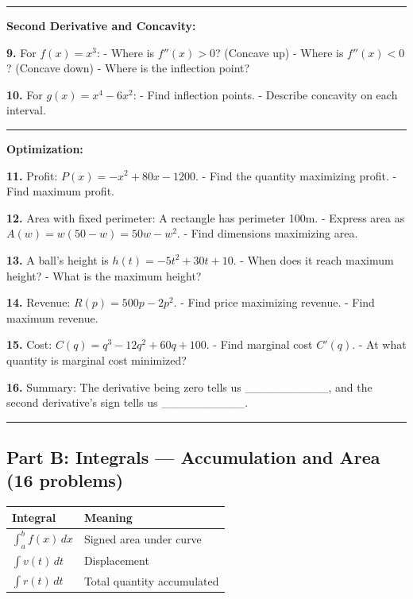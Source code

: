 \documentclass[
  11pt,
]{article}
\begin{document}
\begin{center}\rule{0.5\linewidth}{0.5pt}\end{center}

\textbf{Second Derivative and Concavity:}

\textbf{9.} For \(f(x) = x^3\): - Where is \(f''(x) > 0\)? (Concave up)
- Where is \(f''(x) < 0\)? (Concave down) - Where is the inflection
point?

\textbf{10.} For \(g(x) = x^4 - 6x^2\): - Find inflection points. -
Describe concavity on each interval.

\begin{center}\rule{0.5\linewidth}{0.5pt}\end{center}

\textbf{Optimization:}

\textbf{11.} Profit: \(P(x) = -x^2 + 80x - 1200\). - Find the quantity
maximizing profit. - Find maximum profit.

\textbf{12.} Area with fixed perimeter: A rectangle has perimeter 100m.
- Express area as \(A(w) = w(50 - w) = 50w - w^2\). - Find dimensions
maximizing area.

\textbf{13.} A ball's height is \(h(t) = -5t^2 + 30t + 10\). - When does
it reach maximum height? - What is the maximum height?

\textbf{14.} Revenue: \(R(p) = 500p - 2p^2\). - Find price maximizing
revenue. - Find maximum revenue.

\textbf{15.} Cost: \(C(q) = q^3 - 12q^2 + 60q + 100\). - Find marginal
cost \(C'(q)\). - At what quantity is marginal cost minimized?

\textbf{16.} Summary: The derivative being zero tells us
\_\_\_\_\_\_\_\_\_\_, and the second derivative's sign tells us
\_\_\_\_\_\_\_\_\_\_.

\begin{center}\rule{0.5\linewidth}{0.5pt}\end{center}

\hypertarget{part-b-integrals-accumulation-and-area-16-problems}{%
\subsection{Part B: Integrals --- Accumulation and Area (16
problems)}\label{part-b-integrals-accumulation-and-area-16-problems}}

\begin{longtable}[]{@{}ll@{}}
\toprule\noalign{}
Integral & Meaning \\
\midrule\noalign{}
\endhead
\bottomrule\noalign{}
\endlastfoot
\(\int_a^b f(x) \, dx\) & Signed area under curve \\
\(\int v(t) \, dt\) & Displacement \\
\(\int r(t) \, dt\) & Total quantity accumulated \\
\end{longtable}
\end{document}
